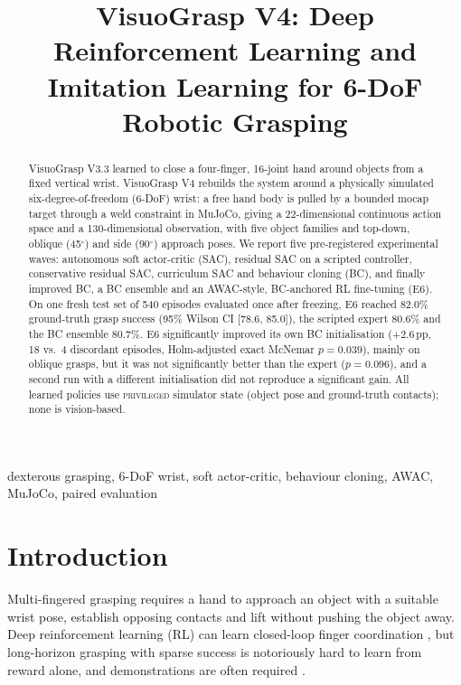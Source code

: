 \documentclass[conference,10pt]{IEEEtran}
\newcommand{\priv}{\textsc{privileged}}
\newcommand{\pp}{\,pp}
\begin{document}
\title{VisuoGrasp V4: Deep Reinforcement Learning and Imitation Learning for 6-DoF Robotic Grasping}

\author{
}

\maketitle

\begin{abstract}
VisuoGrasp V3.3 learned to close a four-finger, 16-joint hand around objects from a fixed vertical wrist.
VisuoGrasp V4 rebuilds the system around a physically simulated six-degree-of-freedom (6-DoF) wrist: a free hand body is pulled
by a bounded mocap target through a weld constraint in MuJoCo, giving a 22-dimensional continuous action space and a
130-dimensional observation, with five object families and top-down, oblique (45$^\circ$) and side (90$^\circ$) approach poses.
We report five pre-registered experimental waves: autonomous soft actor-critic (SAC), residual SAC on a scripted controller,
conservative residual SAC, curriculum SAC and behaviour cloning (BC), and finally improved BC, a BC ensemble and an
AWAC-style, BC-anchored RL fine-tuning (E6). On one fresh test set of 540 episodes evaluated once after freezing, E6 reached
82.0\% ground-truth grasp success (95\% Wilson CI [78.6, 85.0]), the scripted expert 80.6\% and the BC ensemble 80.7\%.
E6 significantly improved its own BC initialisation (+2.6\pp, 18 vs.\ 4 discordant episodes, Holm-adjusted exact McNemar
$p=0.039$), mainly on oblique grasps, but it was not significantly better than the expert ($p=0.096$), and a second run
with a different initialisation did not reproduce a significant gain. All learned policies use \priv{} simulator state
(object pose and ground-truth contacts); none is vision-based.
\end{abstract}

\begin{IEEEkeywords}
dexterous grasping, 6-DoF wrist, soft actor-critic, behaviour cloning, AWAC, MuJoCo, paired evaluation
\end{IEEEkeywords}

\section{Introduction}
Multi-fingered grasping requires a hand to approach an object with a suitable wrist pose, establish opposing contacts and
lift without pushing the object away. Deep reinforcement learning (RL) can learn closed-loop finger coordination
\cite{andrychowicz2020dexterous,rajeswaran2018dapg}, but long-horizon grasping with sparse success is notoriously hard to
learn from reward alone, and demonstrations are often required \cite{nair2018overcoming,vecerik2017ddpgfd}.
\end{document}
